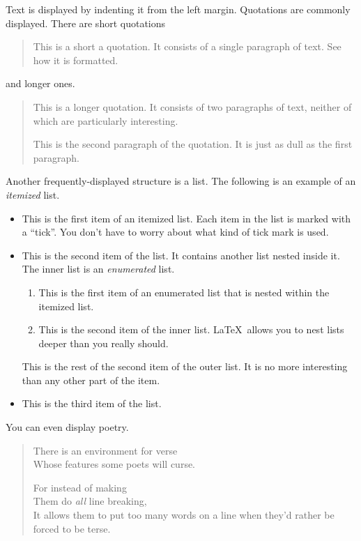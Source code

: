 \documentclass[twocolumn]{article}
\begin{document}
Text is displayed by indenting it from the left margin. Quotations are
commonly displayed. There are short quotations
\begin{quote}
  This is a short a quotation. It consists of a single paragraph of
  text. See how it is formatted.
\end{quote}
and longer ones.
\begin{quotation}
  This is a longer quotation. It consists of two paragraphs of text,
  neither of which are particularly interesting.

  This is the second paragraph of the quotation. It is just as dull as
  the first paragraph.
\end{quotation}
Another frequently-displayed structure is a list. The following is an
example of an \emph{itemized} list.
\begin{itemize}
\item This is the first item of an itemized list. Each item in the
  list is marked with a ``tick''. You don't have to worry about what
  kind of tick mark is used.

\item This is the second item of the list. It contains another list
  nested inside it. The inner list is an \emph{enumerated} list.
  \begin{enumerate}
  \item This is the first item of an enumerated list that is nested
    within the itemized list.

  \item This is the second item of the inner list.  \LaTeX\ allows you
    to nest lists deeper than you really should.
  \end{enumerate}
  This is the rest of the second item of the outer list. It is no more
  interesting than any other part of the item.

\item This is the third item of the list.
\end{itemize}
You can even display poetry.
\begin{verse}
  There is an environment  for verse \\
  Whose features some poets will curse.

  For instead of making\\
  Them do \emph{all} line breaking, \\
  It allows them to put too many words on a line when they'd rather be
  forced to be terse.
\end{verse}
\end{document}
